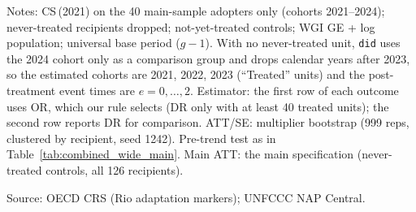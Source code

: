 \begin{table}[H]
\centering
\caption{Adopters-only design: not-yet-treated comparisons among the NAP adopters}
\label{tab:att_adopters_only}
\par\vspace{4pt}
\begin{minipage}{\linewidth}\footnotesize
Notes: CS\,(2021) on the 40 main-sample adopters only (cohorts 2021--2024); never-treated recipients dropped; not-yet-treated controls; WGI GE + log population; universal base period ($g-1$). With no never-treated unit, \texttt{did} uses the 2024 cohort only as a comparison group and drops calendar years after 2023, so the estimated cohorts are 2021, 2022, 2023 (``Treated'' units) and the post-treatment event times are $e=0,\dots,2$. Estimator: the first row of each outcome uses OR, which our rule selects (DR only with at least 40 treated units); the second row reports DR for comparison. ATT/SE: multiplier bootstrap (999 reps, clustered by recipient, seed 1242). Pre-trend test as in Table~\ref{tab:combined_wide_main}. Main ATT: the main specification (never-treated controls, all 126 recipients).\par
Source: OECD CRS (Rio adaptation markers); UNFCCC NAP Central.
\end{minipage}
\end{table}
